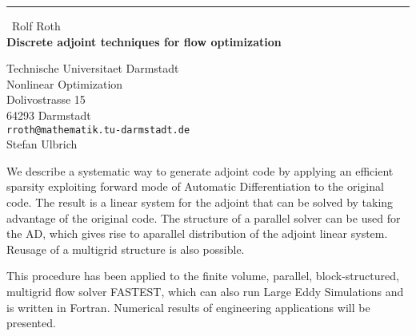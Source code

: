 \documentclass{report}
\begin{document}
\begin{center}
\rule{6in}{1pt} \
{\large Rolf Roth \\
{\bf Discrete adjoint techniques for flow optimization}}

Technische Universitaet Darmstadt \\ Nonlinear Optimization \\ Dolivostrasse 15 \\ 64293 Darmstadt
\\
{\tt rroth@mathematik.tu-darmstadt.de}\\
Stefan Ulbrich\end{center}

We describe a systematic way to generate adjoint code by applying an
efficient sparsity exploiting forward mode of Automatic Differentiation
to the original code. The result is a linear system for the adjoint that
can be solved by taking advantage of the original code.
The structure of a parallel solver can be used for the AD, which gives
rise to aparallel distribution of the adjoint linear system. Reusage of a
multigrid structure is also possible.

This procedure has been applied to the finite volume, parallel,
block-structured, multigrid flow solver FASTEST, which can also run Large
Eddy Simulations and is written in Fortran. Numerical results of
engineering applications will be presented.
\end{document}
